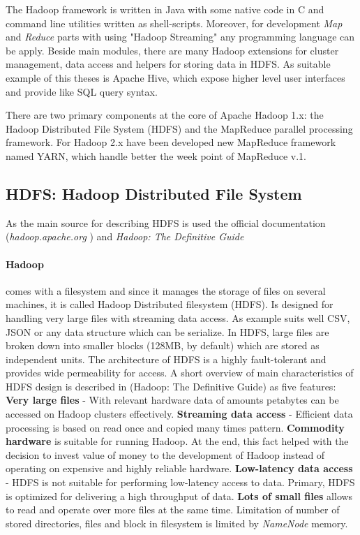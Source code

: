 \documentclass[a4paper,12pt,oneside]{report}
\begin{document}
	The Hadoop framework is written in Java with some native code in C and command
	line utilities written 
	as shell-scripts. Moreover, for development \textit{Map} and \textit{Reduce}
	parts  
	with using "Hadoop Streaming" any programming language can be apply. 
	Beside main modules, there are many Hadoop extensions for cluster management, 
	data access and helpers for storing data in HDFS. As suitable example of this
	theses is Apache Hive, 
	which expose higher level user interfaces and provide like SQL query syntax. 
	
	There are two primary components at the core of Apache Hadoop 1.x: the Hadoop
	Distributed File System 
	(HDFS) and the MapReduce parallel processing framework. For Hadoop 2.x have been
	developed new MapReduce 
	framework named YARN, which handle better the week point of MapReduce v.1.
	
	
	\subsection{HDFS: Hadoop Distributed File System}\label{subsec:hdfs}
	As the main source for describing HDFS is used the official documentation
	(\textit{hadoop.apache.org} 
	\cite{hadoop_web}) and  \textit{Hadoop: The Definitive
		Guide}\cite{hadoop_definitive}
	
	\paragraph*{Hadoop} comes with a filesystem and since it manages the storage of
	files on several 
	machines, it is called Hadoop Distributed filesystem (HDFS). Is designed for
	handling very large files with streaming
	data access. As example suits well CSV, JSON or any data structure which can be
	serialize. \cite{hadoop_hdfs_web} In HDFS, large files are broken down into
	smaller blocks (128MB, by default) which are 
	stored as independent units. The architecture of HDFS is a highly fault-tolerant
	and provides wide permeability
	for access.   
	A short overview of main characteristics of HDFS design is described in
	(Hadoop: The Definitive 
	Guide\cite{hadoop_definitive}) as five features: \textbf{Very large files} -
	With relevant hardware data of amounts petabytes 
	can be accessed on Hadoop clusters effectively. \textbf{Streaming data access} -
	Efficient data processing is based on
	read once and copied many times pattern. \textbf{Commodity hardware} is
	suitable for running Hadoop. At the end,
	this fact helped with the decision to invest value of money to the development
	of Hadoop instead 
	of operating on expensive and highly reliable hardware. \textbf{Low-latency
		data access} - HDFS is not suitable for performing
	low-latency access to data. Primary, HDFS is optimized for delivering
	a high throughput of data. \textbf{Lots of small files} allows to read and
	operate over more files
	at the same time. Limitation of number of stored directories,  files and block
	in filesystem is limited by \emph{NameNode} memory.
	
\end{document}
